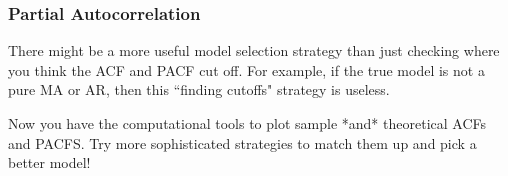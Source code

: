 \documentclass{beamer}
\begin{document}

\begin{frame}[fragile]
\frametitle{Partial Autocorrelation}

There might be a more useful model selection strategy than just checking where you think the ACF and PACF cut off. For example, if the true model is not a pure MA or AR, then this ``finding cutoffs" strategy is useless. 
\newline

Now you have the computational tools to plot sample *and* theoretical ACFs and PACFS. Try more sophisticated strategies to match them up and pick a better model!

\end{frame}
\end{document}
